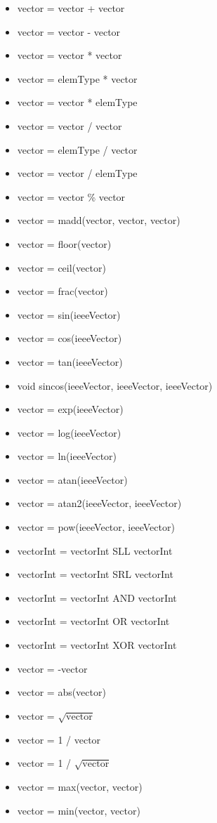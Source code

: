 \documentclass[11pt]{amsart}
\begin{document}
\begin{itemize}
\item vector = vector + vector
\item vector = vector - vector
\item vector = vector * vector
\item vector = elemType * vector
\item vector = vector * elemType
\item vector = vector / vector
\item vector = elemType / vector
\item vector = vector / elemType
\item vector = vector \% vector
\item vector = madd(vector, vector, vector)
\item vector = floor(vector)
\item vector = ceil(vector)
\item vector = frac(vector)
\item vector = sin(ieeeVector)
\item vector = cos(ieeeVector)
\item vector = tan(ieeeVector)
\item void sincos(ieeeVector, ieeeVector, ieeeVector)
\item vector = exp(ieeeVector)
\item vector = log(ieeeVector)
\item vector = ln(ieeeVector)
\item vector = atan(ieeeVector)
\item vector = atan2(ieeeVector, ieeeVector)
\item vector = pow(ieeeVector, ieeeVector)
\item vectorInt = vectorInt SLL vectorInt
\item vectorInt = vectorInt SRL vectorInt
\item vectorInt = vectorInt AND vectorInt
\item vectorInt = vectorInt OR vectorInt
\item vectorInt = vectorInt XOR vectorInt
\item vector = -vector
\item vector = abs(vector)
\item vector = $\sqrt{\text{vector}}$
\item vector = 1 / vector
\item vector = 1 / $\sqrt{\text{vector}}$
\item vector = max(vector, vector)
\item vector = min(vector, vector)

\end{itemize}
\end{document}
